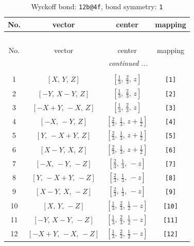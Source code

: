 \documentclass[fleqn,8pt]{jsarticle}
\begin{document}
\begin{longtable}{cccc}
\caption{Wyckoff bond: {\tt 12b@4f}, bond symmetry: {\tt 1}}
 \\
 \hline \hline
No. & vector & center & mapping \\ \hline \endfirsthead

\multicolumn{3}{l}{\tablename\ \thetable{}} \\
 \hline \hline
No. & vector & center & mapping \\ \hline \endhead

 \hline \hline
\multicolumn{3}{r}{\footnotesize\it continued ...} \\ \endfoot

 \hline \hline
\multicolumn{3}{r}{} \\ \endlastfoot

1 & $\left[ X,\, Y,\, Z \right]$ & $\left[ \frac{1}{3},\, \frac{2}{3},\, z \right]$ & {\tt [1]} \\ \hline
2 & $\left[ - Y,\, X - Y,\, Z \right]$ & $\left[ \frac{1}{3},\, \frac{2}{3},\, z \right]$ & {\tt [2]} \\ \hline
3 & $\left[ - X + Y,\, - X,\, Z \right]$ & $\left[ \frac{1}{3},\, \frac{2}{3},\, z \right]$ & {\tt [3]} \\ \hline
4 & $\left[ - X,\, - Y,\, Z \right]$ & $\left[ \frac{2}{3},\, \frac{1}{3},\, z + \frac{1}{2} \right]$ & {\tt [4]} \\ \hline
5 & $\left[ Y,\, - X + Y,\, Z \right]$ & $\left[ \frac{2}{3},\, \frac{1}{3},\, z + \frac{1}{2} \right]$ & {\tt [5]} \\ \hline
6 & $\left[ X - Y,\, X,\, Z \right]$ & $\left[ \frac{2}{3},\, \frac{1}{3},\, z + \frac{1}{2} \right]$ & {\tt [6]} \\ \hline
7 & $\left[ - X,\, - Y,\, - Z \right]$ & $\left[ \frac{2}{3},\, \frac{1}{3},\, - z \right]$ & {\tt [7]} \\ \hline
8 & $\left[ Y,\, - X + Y,\, - Z \right]$ & $\left[ \frac{2}{3},\, \frac{1}{3},\, - z \right]$ & {\tt [8]} \\ \hline
9 & $\left[ X - Y,\, X,\, - Z \right]$ & $\left[ \frac{2}{3},\, \frac{1}{3},\, - z \right]$ & {\tt [9]} \\ \hline
10 & $\left[ X,\, Y,\, - Z \right]$ & $\left[ \frac{1}{3},\, \frac{2}{3},\, \frac{1}{2} - z \right]$ & {\tt [10]} \\ \hline
11 & $\left[ - Y,\, X - Y,\, - Z \right]$ & $\left[ \frac{1}{3},\, \frac{2}{3},\, \frac{1}{2} - z \right]$ & {\tt [11]} \\ \hline
12 & $\left[ - X + Y,\, - X,\, - Z \right]$ & $\left[ \frac{1}{3},\, \frac{2}{3},\, \frac{1}{2} - z \right]$ & {\tt [12]} \\
\end{longtable}
\end{document}
